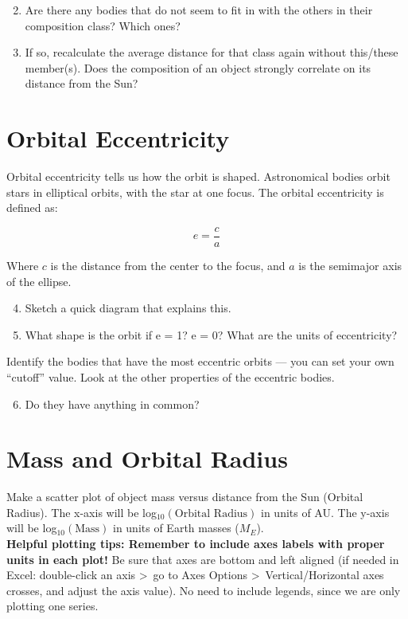 \documentclass[12pt]{article}
\begin{document}
\begin{enumerate}
    \setcounter{enumi}{1}
    \item Are there any bodies that do not seem to fit in with the others in their composition class? Which ones?
    \item If so, recalculate the average distance for that class again without this/these member(s).  Does the composition of an object strongly correlate on its distance from the Sun? 
\end{enumerate}
  

\section*{Orbital Eccentricity}
Orbital eccentricity tells us how the orbit is shaped. Astronomical bodies orbit stars in elliptical orbits, with the star at one focus. The orbital eccentricity is defined as:

\[e = \frac{c}{a}\]

\noindent Where $c$ is the distance from the center to the focus, and $a$ is the semimajor axis of the ellipse. 

\begin{enumerate}
\setcounter{enumi}{3}
    \item Sketch a quick diagram that explains this. 
    \item What shape is the orbit if e = 1? e = 0? What are the units of eccentricity?
\end{enumerate}

\noindent Identify the bodies that have the most eccentric orbits --- you can set your own ``cutoff'' value. Look at the other properties of the eccentric bodies. 

\begin{enumerate}
    \setcounter{enumi}{5}
    \item Do they have anything in common?
\end{enumerate}

\section*{Mass and Orbital Radius}
Make a scatter plot of object mass versus distance from the Sun (Orbital Radius). The x-axis will be log$_{10}(\textrm{Orbital~Radius})$ in units of AU. The y-axis will be log$_{10}(\textrm{Mass})$ in units of Earth masses ($M_E$).\\

\textbf{Helpful plotting tips: Remember to include axes labels with proper units in each plot!} Be sure that axes are bottom and left aligned (if needed in Excel: double-click an axis \textgreater \, go to Axes Options \textgreater \, Vertical/Horizontal axes crosses, and adjust the axis value). No need to include legends, since we are only plotting one series.
\end{document}
